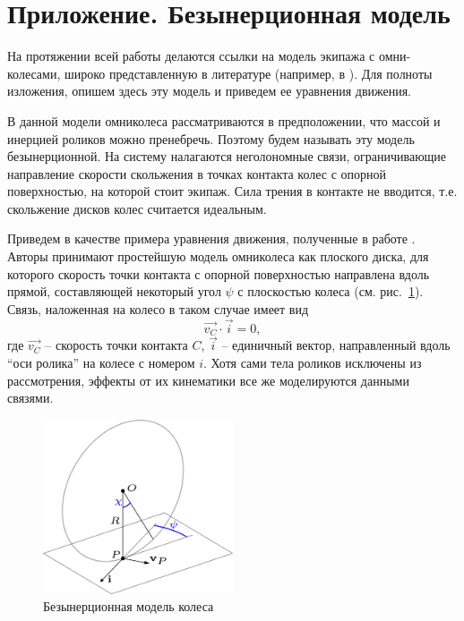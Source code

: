 \section*{Приложение. Безынерционная модель}\label{sect:bezinerz}

На протяжении всей работы делаются ссылки на модель экипажа с омни-колесами, широко представленную в литературе (например, в \cite{Borisov2011, formalskii, ZobovaTatarinovPMM}). Для полноты изложения, опишем здесь эту модель и приведем ее уравнения движения.

В данной модели омниколеса рассматриваются в предположении, что массой и инерцией роликов можно пренебречь. Поэтому будем называть эту модель безынерционной. На систему налагаются неголономные связи, ограничивающие направление скорости скольжения в точках контакта колес с опорной поверхностью, на которой стоит экипаж. Сила трения в контакте не вводится, т.е. скольжение дисков колес считается идеальным.

Приведем в качестве примера уравнения движения, полученные в работе \cite{Borisov2011}. Авторы принимают простейшую модель омниколеса как плоского диска, для которого скорость точки контакта с опорной поверхностью направлена вдоль прямой, составляющей некоторый угол $\psi$ с плоскостью колеса (см. рис.~\ref{fig:bor_wheel_scheme}). Связь, наложенная на колесо в таком случае имеет вид
$$
    \vec{v_C} \cdot \vec{i} = 0,
$$
где $\vec{v_C}$ -- скорость точки контакта $C$, $\vec{i}$ -- единичный вектор, направленный вдоль ``оси ролика'' на колесе с номером $i$. Хотя сами тела роликов исключены из рассмотрения, эффекты от их кинематики все же моделируются данными связями.\\

\begin{figure}[ht!]
    \centering
    \includegraphics[width=0.5\textwidth]{content/pic/asy/wheel_bor.png}
    \caption{Безынерционная модель колеса}
    \label{fig:bor_wheel_scheme}
\end{figure}

